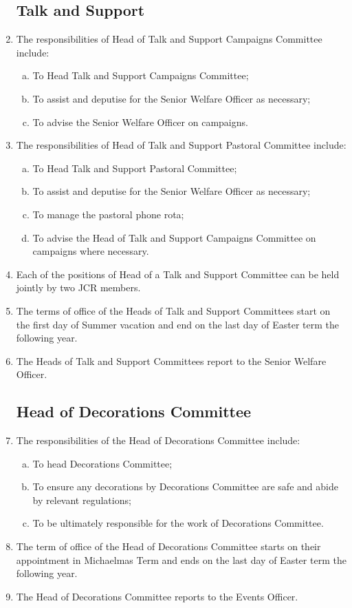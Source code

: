 \documentclass[12pt]{article}
\begin{document}
\begin{enumerate}
    \subsection{Talk and Support}
    \item The responsibilities of Head of Talk and Support Campaigns Committee include:
    \begin{enumerate}[(a)]
        \item To Head Talk and Support Campaigns Committee;
        \item To assist and deputise for the Senior Welfare Officer as necessary;
        \item To advise the Senior Welfare Officer on campaigns.
    \end{enumerate}
    \item The responsibilities of Head of Talk and Support Pastoral Committee include:
    \begin{enumerate}[(a)]
        \item To Head Talk and Support Pastoral Committee;
        \item To assist and deputise for the Senior Welfare Officer as necessary;
        \item To manage the pastoral phone rota;
        \item To advise the Head of Talk and Support Campaigns Committee on campaigns where necessary.
    \end{enumerate}
    \item Each of the positions of Head of a Talk and Support Committee can be held jointly by two JCR members.
    \item The terms of office of the Heads of Talk and Support Committees start on the first day of Summer vacation and end on the last day of Easter term the following year.
    \item The Heads of Talk and Support Committees report to the Senior Welfare Officer.
    \subsection{Head of Decorations Committee}
    \item The responsibilities of the Head of Decorations Committee include:
    \begin{enumerate}[(a)]
        \item To head Decorations Committee;
        \item To ensure any decorations by Decorations Committee are safe and abide by relevant regulations;
        \item To be ultimately responsible for the work of Decorations Committee.
    \end{enumerate}
    \item The term of office of the Head of Decorations Committee starts on their appointment in Michaelmas Term and ends on the last day of Easter term the following year.
    \item The Head of Decorations Committee reports to the Events Officer.

\end{enumerate}
\end{document}
